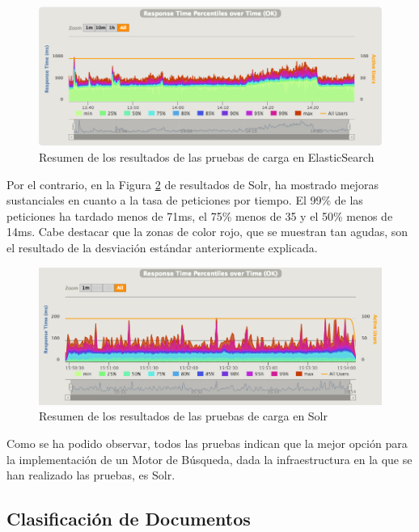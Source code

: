 \documentclass[runningheads,a4paper]{llncs}
\theoremstyle{break}
\begin{document}
\begin{figure}
\includegraphics[scale=0.5]{img/es_gatling.png}
\caption[Resumen de los resultados de las pruebas de carga en ElasticSearch]{Resumen de los resultados de las pruebas de carga en ElasticSearch}
\label{fig:carga_esearch}
\end{figure}

Por el contrario, en la Figura \ref{fig:carga_solr} de resultados de Solr, ha mostrado mejoras sustanciales en cuanto a la tasa de peticiones por tiempo. El 99\% de las peticiones ha tardado menos de 71ms, el 75\% menos de 35 y el 50\% menos de 14ms. Cabe destacar que la zonas de color rojo, que se muestran tan agudas, son el resultado de la desviación estándar anteriormente explicada.

\begin{figure}
\includegraphics[scale=0.5]{img/solr_gatling.png}
\caption[Resumen de los resultados de las pruebas de carga en Solr]{Resumen de los resultados de las pruebas de carga en Solr}
\label{fig:carga_solr}
\end{figure}

Como se ha podido observar, todos las pruebas indican que la mejor opción para la implementación de un Motor de Búsqueda, dada la infraestructura en la que se han realizado las pruebas, es Solr.


\subsection{Clasificación de Documentos}
\end{document}
